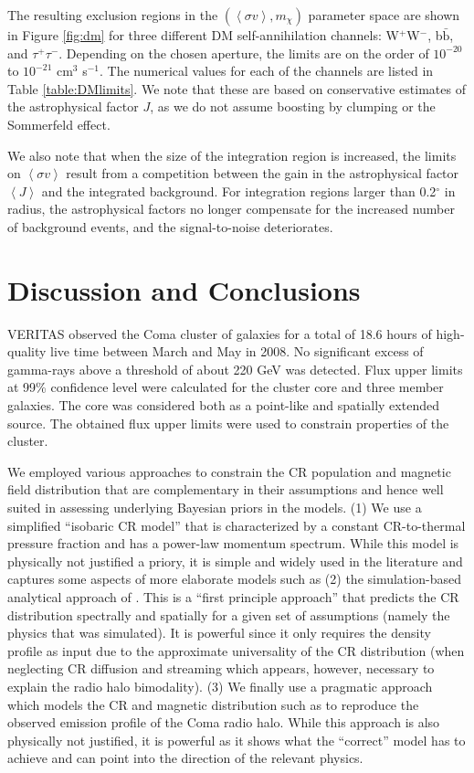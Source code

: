 \documentclass[12pt,manuscript]{aastex}
\newcommand{\expval}[1]{\left\langle #1 \right\rangle}
\begin{document}
The resulting exclusion regions in the $(\expval{\sigma v}, m_{\chi})$ parameter space are shown in
Figure \ref{fig:dm} for three different DM self-annihilation channels: W$^{+}$W$^{-}$,
b$\bar{\mathrm{b}}$, and $\tau^{+}\tau^{-}$. Depending on the chosen aperture, the limits are on
the order of $10^{-20}$ to $10^{-21}$ cm$^{3}$ s$^{-1}$. The numerical values for each of the channels
are listed in Table \ref{table:DMlimits}. We note that these are based on conservative estimates of the
astrophysical factor $J$, as we do not assume boosting by clumping or the Sommerfeld effect.

We also note that when the size of the integration region is increased, the limits on $\expval{\sigma v}$
result from a competition between the gain in the astrophysical factor $\expval{J}$ and the integrated
background. For integration regions larger than 0.2$^{\circ}$ in radius, the astrophysical factors
no longer compensate for the increased number of background events, and the signal-to-noise
deteriorates.

%
%

\section{Discussion and Conclusions}
VERITAS observed the Coma cluster of galaxies for a total of 18.6 hours of high-quality live time
between March and May in 2008. No significant excess of gamma-rays above a threshold of about 220
GeV was detected. Flux upper limits at 99\% confidence level were calculated for the cluster core
and three member galaxies. The core was considered both as a point-like and spatially extended
source. The obtained flux upper limits were used to constrain properties of the cluster.

We employed various approaches to constrain the CR population and magnetic field distribution that
are complementary in their assumptions and hence well suited in assessing underlying Bayesian
priors in the models. (1) We use a simplified ``isobaric CR model'' that is characterized by a
constant CR-to-thermal pressure fraction and has a power-law momentum spectrum.  While this model
is physically not justified a priory, it is simple and widely used in the literature and captures
some aspects of more elaborate models such as (2) the simulation-based analytical approach of
\citet{article:PinzkePfrommer:2010}. This is a ``first principle approach'' that predicts the CR
distribution spectrally and spatially for a given set of assumptions (namely the physics that was
simulated). It is powerful since it only requires the density profile as input due to the
approximate universality of the CR distribution (when neglecting CR diffusion and streaming which
appears, however, necessary to explain the radio halo bimodality). (3) We finally use a pragmatic
approach which models the CR and magnetic distribution such as to reproduce the observed emission
profile of the Coma radio halo. While this approach is also physically not justified, it is
powerful as it shows what the ``correct'' model has to achieve and can point into the direction of
the relevant physics.
\end{document}
